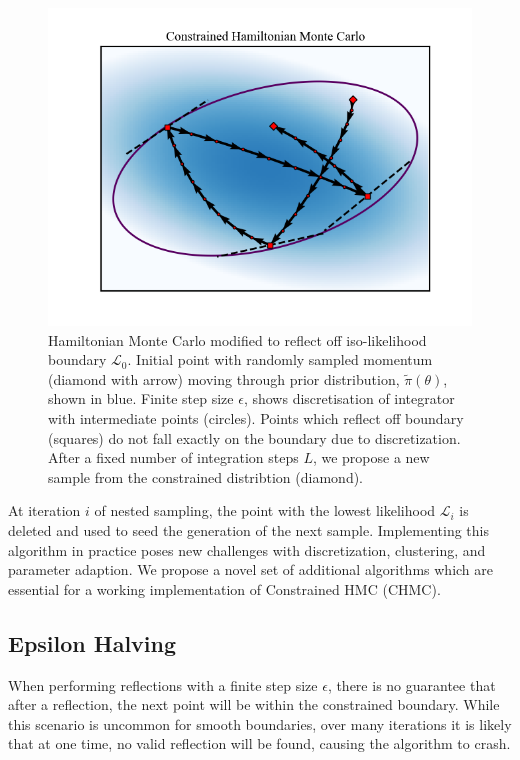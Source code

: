 \documentclass[11pt]{article}
\begin{document}
    \begin{figure}[t!]
        \center
        \includegraphics[width=\linewidth]{../figures/ConstrainedHMC}
        \caption{
        Hamiltonian Monte Carlo modified to reflect off iso-likelihood boundary $\mathcal{L}_0$.
        Initial point with randomly sampled
        momentum (diamond with arrow) moving through prior distribution, $\tilde{\pi}(\theta)$, shown in blue. Finite step size $\epsilon$,
        shows discretisation of integrator with intermediate points (circles). Points which reflect off
        boundary (squares) do not fall exactly on the boundary due to discretization. After a fixed number of
        integration steps $L$, we propose a new sample from the constrained distribtion (diamond).
        }\label{fig:constrainedhmc}
    \end{figure}

    At iteration $i$ of nested sampling, the point with the lowest likelihood $\mathcal{L}_i$ is deleted and used to
    seed the generation of the next sample.
    Implementing this algorithm in practice poses new challenges with discretization, clustering, and parameter adaption.
    We propose a novel set of additional algorithms which are essential for a working implementation of
    Constrained HMC (CHMC).

    \subsection{Epsilon Halving}
    When performing reflections with a finite step size $\epsilon$, there is no guarantee that after a reflection,
    the next point will be within the constrained boundary.
    While this scenario is uncommon for smooth boundaries, over many iterations it is likely that at one time,
    no valid reflection will be found, causing the algorithm to crash.
\end{document}
